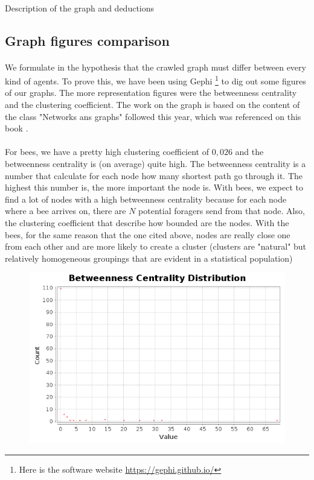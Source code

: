 \documentclass{article}
\begin{document}
		\paragraph{}
			Description of the graph and deductions
	\subsection{Graph figures comparison}
		\paragraph{}
			We formulate in the hypothesis that the crawled graph must differ between every kind of agents.
			To prove this, we have been using Gephi
			\footnote{Here is the software website \url{https://gephi.github.io/}} to dig out some figures of our graphs.
			The more representation figures were the betweenness centrality and the clustering coefficient.
			The work on the graph is based on the content of the class "Networks ans graphs" followed this year,
			which was referenced on this book \cite{Steen10}.
		\paragraph{}
			For bees, we have a pretty high clustering coefficient of $0,026$ and the betweenness centrality is (on average) quite high.
			The betweenness centrality is a number that calculate for each node how many shortest path go through it.
			The highest this number is, the more important the node is.
			With bees, we expect to find a lot of nodes with a high betweenness centrality because for each node where a bee arrives on,
			there are $N$ potential foragers send from that node.
			Also, the clustering coefficient that describe how bounded are the nodes.
			With the bees, for the same reason that the one cited above,
			nodes are really close one from each other and are more likely to create a cluster
			(clusters are "natural" but relatively homogeneous groupings that are evident in a statistical population)
		\begin{figure}[!h]
			\includegraphics[width=1\textwidth]{dh_betweenness_centrality_bees}
		\end{figure}
\end{document}
